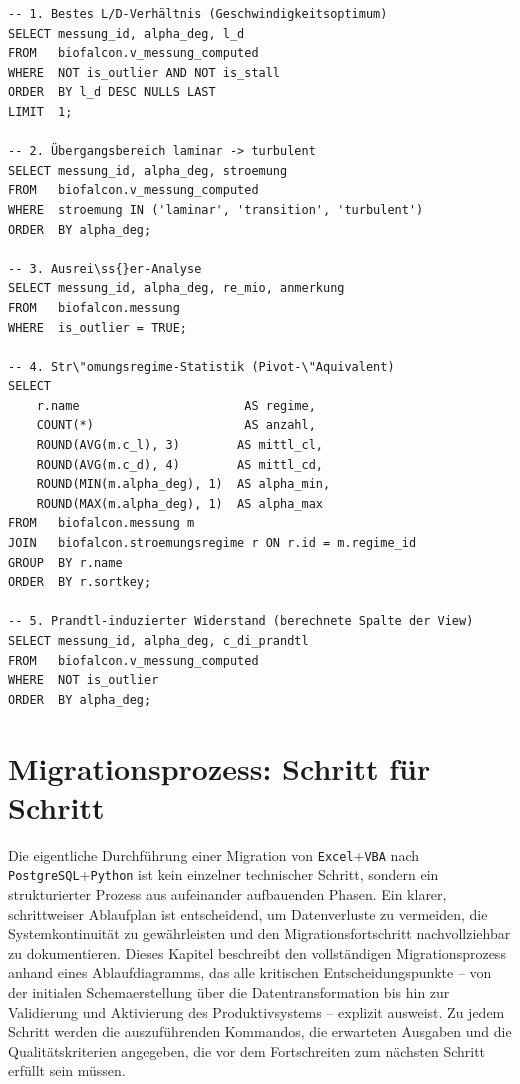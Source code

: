﻿\documentclass[12pt,a4paper]{report}
\theoremstyle{definition}
\theoremstyle{remark}
\newcommand{\excel}{\texttt{Excel}}
\newcommand{\vba}{\texttt{VBA}}
\newcommand{\pg}{\texttt{PostgreSQL}}
\newcommand{\py}{\texttt{Python}}
\begin{document}
\begin{lstlisting}[style=sql, caption={Analytische Abfragen gegen v\_messung\_computed}]
-- 1. Bestes L/D-Verhältnis (Geschwindigkeitsoptimum)
SELECT messung_id, alpha_deg, l_d
FROM   biofalcon.v_messung_computed
WHERE  NOT is_outlier AND NOT is_stall
ORDER  BY l_d DESC NULLS LAST
LIMIT  1;

-- 2. Übergangsbereich laminar -> turbulent
SELECT messung_id, alpha_deg, stroemung
FROM   biofalcon.v_messung_computed
WHERE  stroemung IN ('laminar', 'transition', 'turbulent')
ORDER  BY alpha_deg;

-- 3. Ausrei\ss{}er-Analyse
SELECT messung_id, alpha_deg, re_mio, anmerkung
FROM   biofalcon.messung
WHERE  is_outlier = TRUE;

-- 4. Str\"omungsregime-Statistik (Pivot-\"Aquivalent)
SELECT
    r.name                       AS regime,
    COUNT(*)                     AS anzahl,
    ROUND(AVG(m.c_l), 3)        AS mittl_cl,
    ROUND(AVG(m.c_d), 4)        AS mittl_cd,
    ROUND(MIN(m.alpha_deg), 1)  AS alpha_min,
    ROUND(MAX(m.alpha_deg), 1)  AS alpha_max
FROM   biofalcon.messung m
JOIN   biofalcon.stroemungsregime r ON r.id = m.regime_id
GROUP  BY r.name
ORDER  BY r.sortkey;

-- 5. Prandtl-induzierter Widerstand (berechnete Spalte der View)
SELECT messung_id, alpha_deg, c_di_prandtl
FROM   biofalcon.v_messung_computed
WHERE  NOT is_outlier
ORDER  BY alpha_deg;
\end{lstlisting}

\chapter{Migrationsprozess: Schritt für Schritt}

Die eigentliche Durchführung einer Migration von \excel{}+\vba{} nach \pg{}+\py{} ist kein einzelner technischer Schritt, sondern ein strukturierter Prozess aus aufeinander aufbauenden Phasen. Ein klarer, schrittweiser Ablaufplan ist entscheidend, um Datenverluste zu vermeiden, die Systemkontinuität zu gewährleisten und den Migrationsfortschritt nachvollziehbar zu dokumentieren. Dieses Kapitel beschreibt den vollständigen Migrationsprozess anhand eines Ablaufdiagramms, das alle kritischen Entscheidungspunkte -- von der initialen Schemaerstellung über die Datentransformation bis hin zur Validierung und Aktivierung des Produktivsystems -- explizit ausweist. Zu jedem Schritt werden die auszuführenden Kommandos, die erwarteten Ausgaben und die Qualitätskriterien angegeben, die vor dem Fortschreiten zum nächsten Schritt erfüllt sein müssen.
\end{document}
